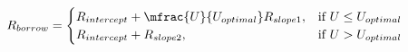 \documentclass[preview]{standalone}
\begin{document}
\begin{align*}
R_{borrow} = \begin{cases} R_{intercept} + \mfrac{U}{U_{optimal}}R_{slope1}, & \text{if } U \leq U_{optimal} \\ R_{intercept} + R_{slope2}, & \text{if } U > U_{optimal} \end{cases}
\end{align*}
\end{document}
